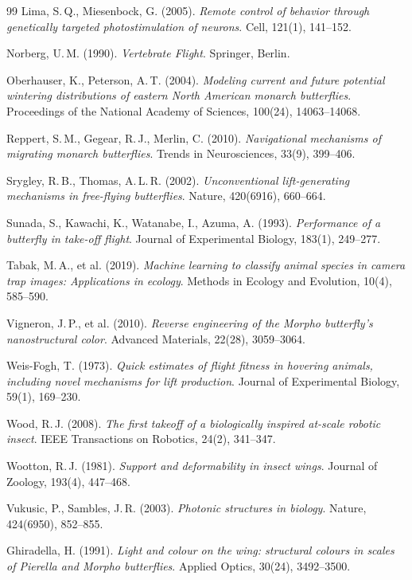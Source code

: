 ﻿\documentclass[a4paper,12pt]{article}
\theoremstyle{definition}
\begin{document}
\begin{thebibliography}{99}
		Lima, S.\,Q., Miesenbock, G. (2005).
		\textit{Remote control of behavior through genetically targeted photostimulation
			of neurons}.
		Cell, 121(1), 141--152.
		
		Norberg, U.\,M. (1990).
		\textit{Vertebrate Flight}.
		Springer, Berlin.
		
		Oberhauser, K., Peterson, A.\,T. (2004).
		\textit{Modeling current and future potential wintering distributions of eastern
			North American monarch butterflies}.
		Proceedings of the National Academy of Sciences, 100(24), 14063--14068.
		
		Reppert, S.\,M., Gegear, R.\,J., Merlin, C. (2010).
		\textit{Navigational mechanisms of migrating monarch butterflies}.
		Trends in Neurosciences, 33(9), 399--406.
		
		Srygley, R.\,B., Thomas, A.\,L.\,R. (2002).
		\textit{Unconventional lift-generating mechanisms in free-flying butterflies}.
		Nature, 420(6916), 660--664.
		
		Sunada, S., Kawachi, K., Watanabe, I., Azuma, A. (1993).
		\textit{Performance of a butterfly in take-off flight}.
		Journal of Experimental Biology, 183(1), 249--277.
		
		Tabak, M.\,A., et al. (2019).
		\textit{Machine learning to classify animal species in camera trap images:
			Applications in ecology}.
		Methods in Ecology and Evolution, 10(4), 585--590.
		
		Vigneron, J.\,P., et al. (2010).
		\textit{Reverse engineering of the Morpho butterfly's nanostructural
			color}.
		Advanced Materials, 22(28), 3059--3064.
		
		Weis-Fogh, T. (1973).
		\textit{Quick estimates of flight fitness in hovering animals, including novel
			mechanisms for lift production}.
		Journal of Experimental Biology, 59(1), 169--230.
		
		Wood, R.\,J. (2008).
		\textit{The first takeoff of a biologically inspired at-scale robotic insect}.
		IEEE Transactions on Robotics, 24(2), 341--347.
		
		Wootton, R.\,J. (1981).
		\textit{Support and deformability in insect wings}.
		Journal of Zoology, 193(4), 447--468.
		
		Vukusic, P., Sambles, J.\,R. (2003).
		\textit{Photonic structures in biology}.
		Nature, 424(6950), 852--855.
		
		Ghiradella, H. (1991).
		\textit{Light and colour on the wing: structural colours in
			scales of \textit{Pierella} and \textit{Morpho} butterflies}.
		Applied Optics, 30(24), 3492--3500.
		
	\end{thebibliography}
	
\end{document}
